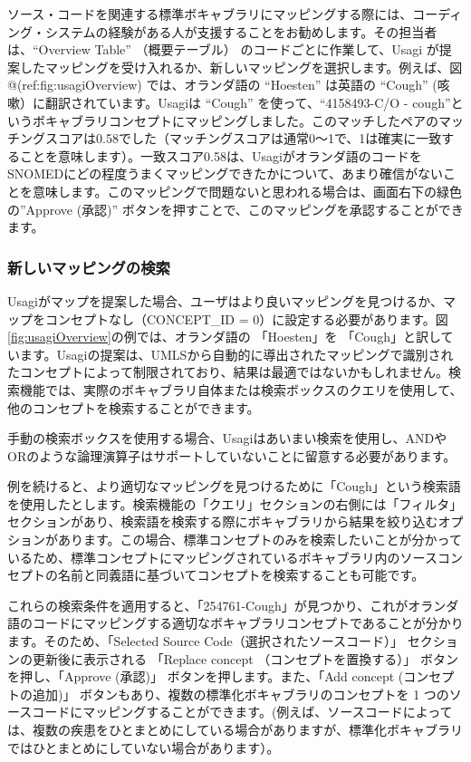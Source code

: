 \documentclass[
  11pt]{book}
\theoremstyle{definition}
\theoremstyle{definition}
\theoremstyle{definition}
\theoremstyle{definition}
\theoremstyle{remark}
\begin{document}
ソース・コードを関連する標準ボキャブラリにマッピングする際には、コーディング・システムの経験がある人が支援することをお勧めします。その担当者は、``Overview Table'' （概要テーブル） のコードごとに作業して、Usagi が提案したマッピングを受け入れるか、新しいマッピングを選択します。例えば、図 @(ref:fig:usagiOverview) では、オランダ語の ``Hoesten'' は英語の ``Cough'' (咳嗽）に翻訳されています。Usagiは ``Cough'' を使って、``4158493-C/O - cough''というボキャブラリコンセプトにマッピングしました。このマッチしたペアのマッチングスコアは0.58でした（マッチングスコアは通常0～1で、1は確実に一致することを意味します）。一致スコア0.58は、Usagiがオランダ語のコードをSNOMEDにどの程度うまくマッピングできたかについて、あまり確信がないことを意味します。このマッピングで問題ないと思われる場合は、画面右下の緑色の''Approve (承認)'' ボタンを押すことで、このマッピングを承認することができます。

\subsubsection*{新しいマッピングの検索}\label{ux65b0ux3057ux3044ux30deux30c3ux30d4ux30f3ux30b0ux306eux691cux7d22}

Usagiがマップを提案した場合、ユーザはより良いマッピングを見つけるか、マップをコンセプトなし（CONCEPT\_ID = 0）に設定する必要があります。図 \ref{fig:usagiOverview}の例では、オランダ語の 「Hoesten」を 「Cough」と訳しています。Usagiの提案は、UMLSから自動的に導出されたマッピングで識別されたコンセプトによって制限されており、結果は最適ではないかもしれません。検索機能では、実際のボキャブラリ自体または検索ボックスのクエリを使用して、他のコンセプトを検索することができます。

手動の検索ボックスを使用する場合、Usagiはあいまい検索を使用し、ANDやORのような論理演算子はサポートしていないことに留意する必要があります。

例を続けると、より適切なマッピングを見つけるために「Cough」という検索語を使用したとします。検索機能の「クエリ」セクションの右側には「フィルタ」セクションがあり、検索語を検索する際にボキャブラリから結果を絞り込むオプションがあります。この場合、標準コンセプトのみを検索したいことが分かっているため、標準コンセプトにマッピングされているボキャブラリ内のソースコンセプトの名前と同義語に基づいてコンセプトを検索することも可能です。

これらの検索条件を適用すると、「254761-Cough」が見つかり、これがオランダ語のコードにマッピングする適切なボキャブラリコンセプトであることが分かります。そのため、「Selected Source Code（選択されたソースコード）」 セクションの更新後に表示される 「Replace concept （コンセプトを置換する）」 ボタンを押し、「Approve (承認)」 ボタンを押します。また、「Add concept (コンセプトの追加)」 ボタンもあり、複数の標準化ボキャブラリのコンセプトを 1 つのソースコードにマッピングすることができます。(例えば、ソースコードによっては、複数の疾患をひとまとめにしている場合がありますが、標準化ボキャブラリではひとまとめにしていない場合があります）。
\end{document}
